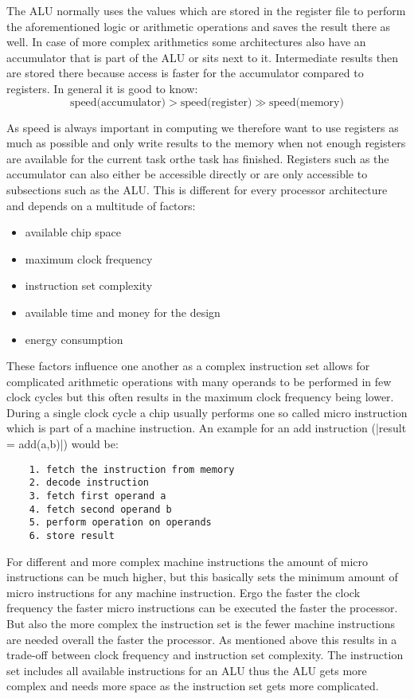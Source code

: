 The ALU normally uses the values which are stored in the register file to perform the aforementioned logic or arithmetic operations and saves the result there as well.
In case of more complex arithmetics some architectures also have an accumulator that is part of the ALU or sits next to it.
Intermediate results then are stored there because access is faster for the accumulator compared to registers.
In general it is good to know:
\begin{equation}
    \text{speed(accumulator)} > \text{speed(register)} \gg \text{speed(memory)}
\end{equation}

As speed is always important in computing we therefore want to use registers as much as possible and only write results to the memory when not enough registers are available for the current task orthe task has finished.
Registers such as the accumulator can also either be accessible directly or are only accessible to subsections such as the ALU.
This is different for every processor architecture and depends on a multitude of factors:
\begin{itemize}
    \item available chip space
    \item maximum clock frequency
    \item instruction set complexity
    \item available time and money for the design
    \item energy consumption
\end{itemize}

These factors influence one another as a complex instruction set allows for complicated arithmetic operations with many operands to be performed in few clock cycles but this often results in the maximum clock frequency being lower.
During a single clock cycle a chip usually performs one so called micro instruction which is part of a machine instruction.
An example for an add instruction (|result = add(a,b)|) would be:
\begin{lstlisting}
    1. fetch the instruction from memory
    2. decode instruction
    3. fetch first operand a
    4. fetch second operand b
    5. perform operation on operands
    6. store result
\end{lstlisting}
For different and more complex machine instructions the amount of micro instructions can be much higher, but this basically sets the minimum amount of micro instructions for any machine instruction.
Ergo the faster the clock frequency the faster micro instructions can be executed the faster the processor.
But also the more complex the instruction set is the fewer machine instructions are needed overall the faster the processor.
As mentioned above this results in a trade-off between clock frequency and instruction set complexity.
The instruction set includes all available instructions for an ALU thus the ALU gets more complex and needs more space as the instruction set gets more complicated.

